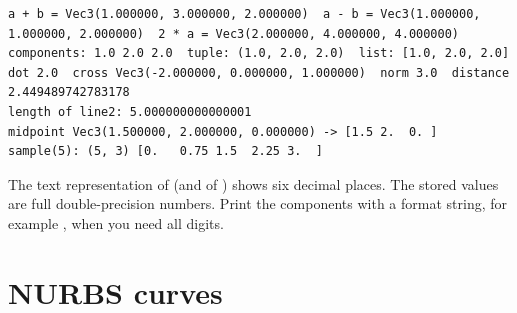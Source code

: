 \begin{lstlisting}[style=text]
a + b = Vec3(1.000000, 3.000000, 2.000000)  a - b = Vec3(1.000000, 1.000000, 2.000000)  2 * a = Vec3(2.000000, 4.000000, 4.000000)
components: 1.0 2.0 2.0  tuple: (1.0, 2.0, 2.0)  list: [1.0, 2.0, 2.0]
dot 2.0  cross Vec3(-2.000000, 0.000000, 1.000000)  norm 3.0  distance 2.449489742783178
length of line2: 5.000000000000001
midpoint Vec3(1.500000, 2.000000, 0.000000) -> [1.5 2.  0. ]
sample(5): (5, 3) [0.   0.75 1.5  2.25 3.  ]
\end{lstlisting}

\begin{note}
The text representation of  (and of ) shows six decimal places. The
stored values are full double-precision numbers. Print the components with a format string,
for example , when you need all digits.
\end{note}

\section{NURBS curves}\label{sec:concepts-nurbs}

